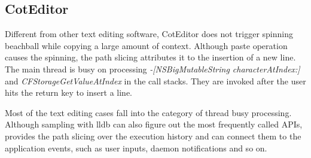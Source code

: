 \subsection{CotEditor}
Different from other text editing software, CotEditor does not trigger spinning
beachball while copying a large amount of context. Although paste operation
causes the spinning, the path slicing attributes it to the insertion of a
new line. The main thread is busy on processing \textit{-[NSBigMutableString
characterAtIndex:]} and \textit{CFStorageGetValueAtIndex} in the call stacks.
They are invoked after the user hits the return key to insert a line.

Most of the text editing cases fall into the category of thread busy processing.
Although sampling with lldb can also figure out the most frequently called APIs,
\xxx provides the path slicing over the execution history and can connect them
to the application events, such as user inputs, daemon notifications and so on.
